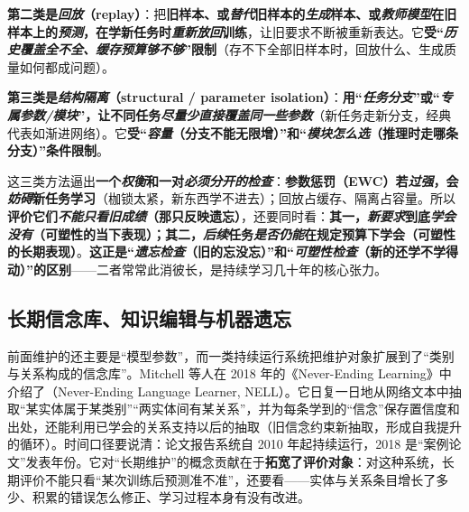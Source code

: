 \textbf{第二类是\emph{回放}（replay）}：把\textbf{旧样本、或\emph{替代}旧样本的\emph{生成}样本、或\emph{教师模型}在旧样本上的\emph{预测}，在学新任务时\emph{重新放回}训练}，让旧要求不断被重新表达。它\textbf{受“\emph{历史覆盖\emph{全不全}、缓存预算\emph{够不够}}”限制}（存不下全部旧样本时，回放什么、生成质量如何都成问题）。

\textbf{第三类是\emph{结构隔离}（structural / parameter isolation）}：\textbf{用“\emph{任务分支}”或“\emph{专属参数/模块}”，让不同任务\emph{尽量少\emph{直接覆盖}同一些参数}}（新任务走新分支，经典代表如渐进网络）。它\textbf{受“\emph{容量}（分支不能无限增）”和“\emph{模块\emph{怎么选}}（推理时走哪条分支）”条件限制}。

这三类方法逼出\textbf{一个\emph{权衡}和一对\emph{必须分开的检查}}：\textbf{参数惩罚（EWC）若\emph{过强}，会\emph{妨碍}新任务学习}（枷锁太紧，新东西学不进去）；回放占缓存、隔离占容量。所以\textbf{评价它们\emph{不能只看旧成绩}（那只反映遗忘）}，还要同时看：\textbf{其一，\emph{新要求}到底\emph{学会没有}（\textbf{可塑性}的当下表现）；其二，\emph{后续}任务\emph{是否仍能}在规定预算下学会（\textbf{可塑性}的长期表现）}。\textbf{这正是“\emph{遗忘检查}（旧的忘没忘）”和“\emph{可塑性检查}（新的还学不学得动）”的区别}——二者常常此消彼长，是持续学习几十年的核心张力。

\subsection{长期信念库、知识编辑与机器遗忘}
\label{sec:ket-overview-history-beliefs}

前面维护的还主要是“模型参数”，而一类持续运行系统把维护对象扩展到了“类别与关系构成的信念库”。Mitchell 等人在 2018 年的《Never-Ending Learning》中介绍了（Never-Ending Language Learner, NELL）。它日复一日地从网络文本中抽取“某实体属于某类别”“两实体间有某关系”，并为每条学到的“信念”保存置信度和出处，还能利用已学会的关系支持以后的抽取（旧信念约束新抽取，形成自我提升的循环）。时间口径要说清：论文报告系统自 2010 年起持续运行，2018 是“案例论文”发表年份。它对“长期维护”的概念贡献在于\textbf{拓宽了评价对象}：对这种系统，长期评价不能只看“某次训练后预测准不准”，还要看——实体与关系条目增长了多少、积累的错误怎么修正、学习过程本身有没有改进。

